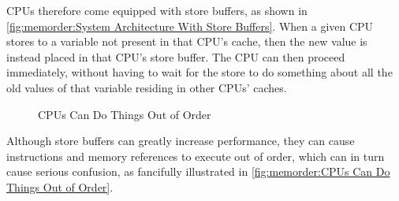 CPUs therefore come equipped with store buffers, as shown in
\cref{fig:memorder:System Architecture With Store Buffers}.
When a given CPU stores to a variable
not present in that CPU's cache, then the new value
is instead placed in that CPU's store buffer.
The CPU can then proceed immediately, without having to wait for the
store to do something about all the old values of that variable
residing in other CPUs' caches.

\begin{figure}
\centering
{}
\caption{CPUs Can Do Things Out of Order}
\end{figure}

Although store buffers can greatly increase performance, they can cause
instructions and memory references to execute out of order, which can
in turn cause serious confusion, as fancifully illustrated in
\cref{fig:memorder:CPUs Can Do Things Out of Order}.

\begin{table}
\renewcommand*{\arraystretch}{1.1}
\small
\centering\OneColumnHSpace{-0.1in}
\caption{Memory Misordering: Store-Buffering Sequence of Events}
\label{tab:memorder:Memory Misordering: Store-Buffering Sequence of Events}
\end{table}

